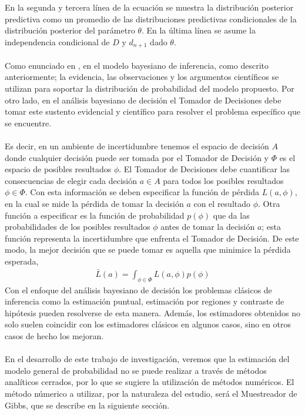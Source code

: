 En la segunda y tercera l\'inea de la ecuaci\'on se muestra la distribuci\'on posterior predictiva como un promedio de las distribuciones predictivas condicionales de la distribuci\'on posterior del par\'ametro $\theta$. En la \'ultima l\'inea se asume la independencia condicional de $D$ y $d_{n+1}$ dado $\theta$.\\
\\
Como enunciado en \cite{smith2010bayesian}, en el modelo bayesiano de inferencia, como descrito anteriormente; la evidencia, las observaciones y los argumentos cient\'ificos se utilizan para soportar la distribuci\'on de probabilidad del modelo propuesto. Por otro lado, en el an\'alisis bayesiano de decisi\'on el Tomador de Decisiones debe tomar este sustento evidencial y cient\'ifico para resolver el problema espec\'ifico que se encuentre.\\
\\
Es decir, en un ambiente de incertidumbre tenemos el espacio de decisi\'on $A$ donde cualquier decisi\'on puede ser tomada por el Tomador de Decisi\'on y $\Phi$ es el espacio de posibles resultados $\phi$. El Tomador de Decisiones debe cuantificar las consecuencias de elegir cada decisi\'on $a \in A$ para todos los posibles resultados $\phi \in \Phi$. Con esta informaci\'on se deben especificar la funci\'on de p\'erdida $L(a,\phi)$, en la cual se mide la p\'erdida de tomar la decisi\'on $a$ con el resultado $\phi$. Otra funci\'on a especificar es la funci\'on de probabilidad $p(\phi)$ que da las probabilidades de los posibles resultados $\phi$ antes de tomar la decisi\'on $a$; esta funci\'on representa la incertidumbre que enfrenta el Tomador de Decisi\'on. De este modo, la mejor decisi\'on que se puede tomar es aquella que minimice la p\'erdida esperada,
\begin{align*}
\bar{L}(a)= \int_{\phi \in \Phi} L(a,\phi)p(\phi)
\end{align*}
Con el enfoque del an\'alisis bayesiano de decisi\'on los problemas cl\'asicos de inferencia como la estimaci\'on puntual, estimaci\'on por regiones y contraste de hip\'otesis pueden resolverse de esta manera. Adem\'as, los estimadores obtenidos no solo suelen coincidir con los estimadores cl\'asicos en algunos casos, sino en otros casos de hecho los mejoran.\\
\\
En el desarrollo de este trabajo de investigaci\'on, veremos que la estimaci\'on del modelo general de probabilidad no se puede realizar a trav\'es de m\'etodos anal\'iticos cerrados, por lo que se sugiere la utilizaci\'on de m\'etodos num\'ericos. El m\'etodo n\'umerico a utilizar, por la naturaleza del estudio, ser\'a el Muestreador de Gibbs, que se describe en la siguiente secci\'on.

